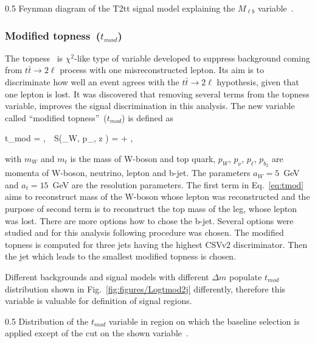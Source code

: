                  {0.5}       %
                 { Feynman diagram of the T2tt signal model explaining the $M_{\ell b}$ variable~\cite{CMS:2016vew}. }

\subsubsection{Modified topness~($t_{mod}$)}

The topness~\cite{Graesser:2012qy} is $\chi^{2}$-like type of variable developed to suppress background coming from $t \bar{t} \to 2\ell$ process with one misreconstructed lepton. Its aim is to discriminate how well an event agrees with the $t \bar{t} \to 2\ell$ hypothesis, given that one lepton is lost. It was discovered that removing several terms from the topness variable, improves the signal discrimination in this analysis. The new variable called ``modified topness''~($t_{mod}$) is defined as


{
 t_{mod} = ,~~S(_{W}, p_{\nu, z} ) =  + ,
}

with $m_{W}$ and  $m_{t}$ is the mass of W-boson and top quark, ${p}_{W}$, ${p}_{\nu}$, ${p}_{\ell}$, ${p}_{b_{2}}$ are momenta of W-boson, neutrino, lepton and b-jet. The parameters $a_{W} =5$~GeV and $a_{t}=15$~GeV are the resolution parameters. The first term in Eq.~\ref{eq:tmod} aims to reconstruct mass of the W-boson whose lepton was reconstructed and the purpose of second term is to reconstruct the top mass of the leg, whose lepton was lost. There are more options how to chose the  b-jet. Several options were studied and for this analysis following procedure was chosen. The modified topness is computed for three jets having the highest CSVv2 discriminator. Then the jet which leads to the smallest modified topness is chosen.

Different backgrounds and signal models with different $\Delta m$ populate $t_{mod}$ distribution shown in Fig.~\ref{fig:figures/Logtmod2j} differently, therefore this variable is valuable for definition of signal regions.

                 {0.5}       %
                 { Distribution of the $t_{mod}$ variable in region on which the baseline selection is applied except of the cut on the shown variable~\cite{website:stopSupp}. }


